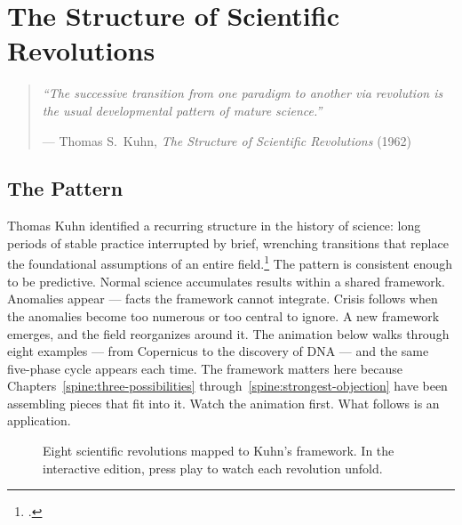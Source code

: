 
\chapter{The Structure of Scientific Revolutions}
\label{spine:scientific-revolutions}

\begin{quote}\small\textit{%
``The successive transition from one paradigm to another via revolution
is the usual developmental pattern of mature science.''%
}\par\raggedleft --- Thomas S.\ Kuhn, \emph{The Structure of Scientific
Revolutions} (1962)\end{quote}

\vspace{0.5cm}

\section*{The Pattern}
\label{spine:sr-the-pattern}

Thomas Kuhn identified a recurring structure in the history of science: long periods of stable practice interrupted by brief, wrenching transitions that replace the foundational assumptions of an entire field.\footcite{kuhn1962} The pattern is consistent enough to be predictive. Normal science accumulates results within a shared framework. Anomalies appear --- facts the framework cannot integrate. Crisis follows when the anomalies become too numerous or too central to ignore. A new framework emerges, and the field reorganizes around it. The animation below walks through eight examples --- from Copernicus to the discovery of DNA --- and the same five-phase cycle appears each time. The framework matters here because Chapters~\ref{spine:three-possibilities} through~\ref{spine:strongest-objection} have been assembling pieces that fit into it. Watch the animation first. What follows is an application.

\begin{figure}[ht]
\centering
\caption{Eight scientific revolutions mapped to Kuhn's framework. In the
interactive edition, press play to watch each revolution unfold.}
\label{fig:kuhn-map}
\end{figure}

